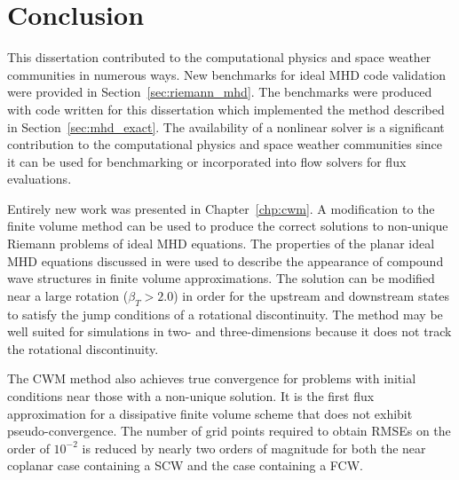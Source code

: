 %
%


\chapter[Conclusion]{Conclusion}
\label{chp:conclusion}

This dissertation contributed to the computational physics and space weather communities in numerous ways.  New benchmarks for ideal MHD code validation were provided in Section~\ref{sec:riemann_mhd}.  The benchmarks were produced with code written for this dissertation which implemented the method described in Section~\ref{sec:mhd_exact}.  The availability of a nonlinear solver is a significant contribution to the computational physics and space weather communities since it can be used for benchmarking or incorporated into flow solvers for flux evaluations.  

Entirely new work was presented in Chapter~\ref{chp:cwm}.  A modification to the finite volume method can be used to produce the correct solutions to non-unique Riemann problems of ideal MHD equations.  The properties of the planar ideal MHD equations discussed in \citep{Falle:2001} were used to describe the appearance of compound wave structures in finite volume approximations.  The solution can be modified near a large rotation ($\beta_T > 2.0$) in order for the upstream and downstream states to satisfy the jump conditions of a rotational discontinuity.  The method may be well suited for simulations in two- and three-dimensions because it does not track the rotational discontinuity.

The CWM method also achieves true convergence for problems with initial conditions near those with a non-unique solution.  It is the first flux approximation for a dissipative finite volume scheme that does not exhibit pseudo-convergence.  The number of grid points required to obtain RMSEs on the order of $10^{-2}$ is reduced by nearly two orders of magnitude for both the near coplanar case containing a SCW and the case containing a FCW.  

